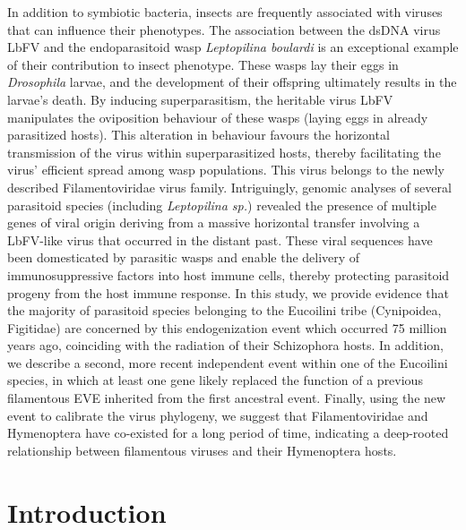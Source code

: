 In addition to symbiotic bacteria, insects are frequently associated with viruses that can influence their phenotypes. The association between the dsDNA virus LbFV and the endoparasitoid wasp \textit{Leptopilina boulardi} is an exceptional example of their contribution to insect phenotype. These wasps lay their eggs in \textit{Drosophila} larvae, and the development of their offspring ultimately results in the larvae's death. By inducing superparasitism, the heritable virus LbFV manipulates the oviposition behaviour of these wasps (laying eggs in already parasitized hosts). This alteration in behaviour favours the horizontal transmission of the virus within superparasitized hosts, thereby facilitating the virus' efficient spread among wasp populations. This virus belongs to the newly described Filamentoviridae virus family. Intriguingly, genomic analyses of several parasitoid species (including \textit{Leptopilina sp.}) revealed the presence of multiple genes of viral origin deriving from a massive horizontal transfer involving a LbFV-like virus that occurred in the distant past. These viral sequences have been domesticated by parasitic wasps and enable the delivery of immunosuppressive factors into host immune cells, thereby protecting parasitoid progeny from the host immune response. In this study, we provide evidence that the majority of parasitoid species belonging to the Eucoilini tribe (Cynipoidea, Figitidae) are concerned by this endogenization event which occurred 75 million years ago, coinciding with the radiation of their Schizophora hosts. In addition, we describe a second, more recent independent event within one of the Eucoilini species, in which at least one gene likely replaced the function of a previous filamentous EVE inherited from the first ancestral event. Finally, using the new event to calibrate the virus phylogeny, we suggest that Filamentoviridae and Hymenoptera have co-existed for a long period of time, indicating a deep-rooted relationship between filamentous viruses and their Hymenoptera hosts.

\section{Introduction}

